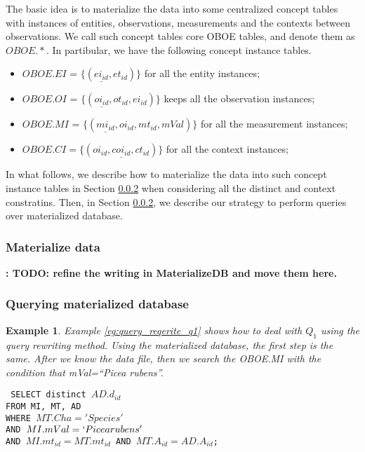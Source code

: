 \documentclass[conference]{IEEEtran}
\newtheorem{example}{Example}[section]
\begin{document}
The basic idea is to materialize the data into some centralized
concept tables with instances of entities, observations, measurements
and the contexts between observations. 
We call such concept tables core OBOE tables, and denote them as
$OBOE.*$. 
In partibular, we have the following concept instance tables. 
\begin{itemize}
\item $OBOE.EI$ = $\{(\underline{ei_{id}}, et_{id})\}$ for all the entity instances;
\item $OBOE.OI$ = $\{(\underline{oi_{id}}, ot_{id}, ei_{id})\}$ keeps
  all the observation instances;
\item $OBOE.MI$ = $\{(\underline{mi_{id}}, oi_{id}, mt_{id},
  mVal)\}$ for all the measurement instances;
\item $OBOE.CI =\{(\underline{oi_{id},coi_{id},ct_{id}})\}$ for
  all the context instances;
\end{itemize}


In what follows, we describe how to materialize the data into such
concept instance tables in Section \ref{sec:materialilzedb} when
considering all the distinct and context constratins. 
Then, in Section \ref{sec:materialilzedb}, we describe our strategy to
perform queries over materialized database. 

\subsubsection{Materialize data}\label{sec:materialilzedb}
{\bf: TODO: refine the writing in MaterializeDB and move them here.}

\subsubsection{Querying materialized database}\label{sec:materialilzedb}

\begin{example} \label{eg:materialize_db_q1}
Example \ref{eg:query_reqerite_q1} shows how to deal with $Q_1$ using
the query rewriting method. 
Using the  materialized database, the first step is the same.
After we know the data file, then we search the OBOE.MI with the
condition that {\em mVal=``Picea rubens''}.
\end{example}

{\tt 
SELECT distinct $AD.d_{id}$\\
FROM MI, MT, AD\\ 
WHERE $MT.Cha='Species'$ \\
AND $MI.mVal = `Picea rubens'$\\
AND $MI.mt_{id}=MT.mt_{id}$ AND $MT.A_{id}=AD.A_{id}$; %
}
\end{document}
